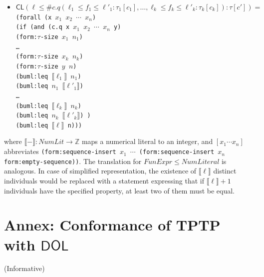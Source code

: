 \documentclass[10pt,fleqn,final]{scrreprt}
\newcommand{\cbs}[0]{\color{red}\xspace} %
\newcommand{\cbe}[0]{\color{black}\xspace} %
\newcommand*{\CL}{\ensuremath{\mathsf{CL}}\xspace}
\newcommand*{\DOL}{\ensuremath{\mathsf{DOL}}\xspace}
\newcommand{\informative}[0]{{\begin{center}{\Large{(Informative})}\end{center}} \bigskip}
\newcommand{\infannex}[1]{ \chapter{Annex: #1}  \informative }
\newenvironment{definitions}[0]{\medskip }{}
\newcommand{\ZZ}{\mathbb{Z}}
\newcommand{\sem}[1]{\mathopen\llbracket#1\mathclose\rrbracket}
\newcommand{\white}[1]{{\color{white}{#1}}}
\newcommand{\qqquad}{\white{x}\qquad}
\begin{document}
\begin{definitions}
\begin{itemize}
\item
$\CL(\ell \leq \mathsf{\#}c.q(\ell_1 \leq f_1 \leq \ell'_1: \tau_1[c_1], \ldots, \ell_k\leq f_k \leq \ell'_k: \tau_k[c_k]) : \tau[c'])=$\\
\texttt{(forall (x $x_1$ $x_2$ $\cdots$  $x_n$)\\
\qqquad  (if (and (c.q x $x_1$ $x_2$ $\cdots$  $x_n$ y) \\
\qqquad\qqquad\qquad (form:$\tau$-size $x_1$ $n_1$) \\
\qqquad\qqquad\qquad\ldots\\
\qqquad\qqquad\qquad (form:$\tau$-size $x_k$ $n_k$) \\
\qqquad\qqquad\qquad (form:$\tau$-size $y$ $n$) \\
\qqquad\qqquad\qquad (buml:leq $\sem{\ell_1}$ $n_1$)\\
\qqquad\qqquad\qquad (buml:leq $n_1$ $\sem{\ell'_1}$)\\
\qqquad\qqquad\qquad\ldots\\
\qqquad\qqquad\qquad (buml:leq $\sem{\ell_k}$ $n_k$)\\
\qqquad\qqquad\qquad (buml:leq $n_k$ $\sem{\ell'_k}$) )\\
\qqquad\qqquad (buml:leq $\sem{\ell}$ n)))}
\end{itemize}
%
where $\sem{-} : \mathit{NumLit} \to \ZZ$ maps a numerical literal
to an integer, and $[x_1\cdots x_n]$ abbreviates \texttt{(form:sequence-insert $x_1$ $\cdots$ (form:sequence-insert $x_n$ form:empty-sequence))}.
The translation for  $\mathit{FunExpr} \leq \mathit{NumLiteral}$
is analogous. In case of simplified representation,\cbs
the existence of $\sem{\ell}$ distinct individuals 
would be replaced\cbe
with a statement
expressing that if $\sem{\ell}+1$ individuals have the specified property,
at least two of them must be equal.





\infannex{Conformance of TPTP with \DOL}\label{a:TPTP}


\end{definitions}
\end{document}
